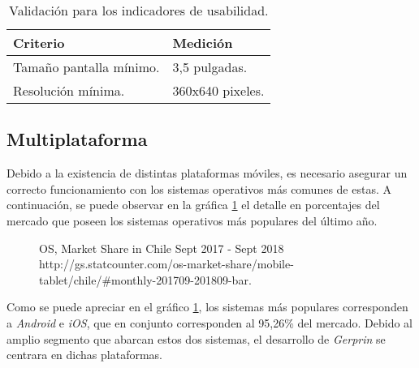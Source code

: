 \begin{table}[H]
    \caption[Validación para los indicadores de usabilidad.] {Validación para los indicadores de usabilidad.}
    \label{tbl:Criterios de Validación usabilidad}
    \begin{tabular}{|p{}|p{}|}
        \hline
        \textbf{Criterio} &  \textbf{Medición}\\
    	\hline
    	\hline
    	Tamaño pantalla mínimo. & 3,5 pulgadas. \\ \hline
		Resolución mínima.  & 360x640 pixeles. \\ 
        \hline
    \end{tabular}
\end{table}

\subsection{Multiplataforma}

Debido a la existencia de distintas plataformas móviles, es necesario asegurar un correcto funcionamiento con los sistemas operativos más comunes de estas. A continuación, se puede observar en la gráfica \ref{chart:OS} el detalle en porcentajes del mercado que poseen los sistemas operativos más populares del último año.

\begin{figure}[H]
	\centering
	\caption[OS, Market Share in Chile Sept 2017 - Sept 2018.]{OS, Market Share in Chile Sept 2017 - Sept 2018 \\ http://gs.statcounter.com/os-market-share/mobile-tablet/chile/\#monthly-201709-201809-bar.}
	\label{chart:OS}
	\begin{bchart}[step=10, max=100, width=.8\textwidth, unit=\%]
	\end{bchart}
\end{figure}

Como se puede apreciar en el gráfico \ref{chart:OS}, los sistemas más populares corresponden a \emph{Android} e \emph{iOS}, que en conjunto corresponden al 95,26\% del mercado. Debido al amplio segmento que abarcan estos dos sistemas, el desarrollo de \emph{Gerprin} se centrara en dichas plataformas.


